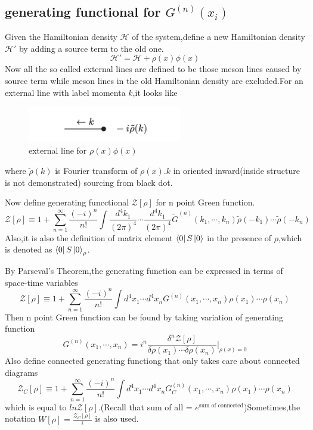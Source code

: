 \documentclass[a4paper]{article}
\begin{document}
\subsection{generating functional for $G^{(n)}(x_i)$}
Given the Hamiltonian density $\mathscr{H}$ of the system,define a new Hamiltonian density $\mathscr{H}'$ by adding a source term to the old one.$$\mathscr{H}'=\mathscr{H}+\rho(x)\phi(x)$$Now all the so called external lines are defined to be those meson lines caused by source term while meson lines in the old Hamiltonian density are excluded.For an external line with label momenta $k$,it looks like
\begin{figure}[htbp]
	\centering
	\includegraphics[width=0.6\textwidth]{21.png}
	\caption{external line for $\rho(x)\phi(x)$}
\end{figure}

where $\tilde{\rho}(k)$ is Fourier transform of $\rho(x)$.$k$ in oriented inward(inside structure is not demonstrated) sourcing from black dot.
\par Now define generating funcctional $\mathscr{Z}[\rho]$ for n point Green function.
$$\mathscr{Z}[\rho]\equiv1+\sum_{n=1}^{\infty}\frac{(-i)^n}{n!}\int\frac{d^4k_1}{(2\pi)^4}\cdots\frac{d^4k_1}{(2\pi)^4}\tilde{G}^{(n)}(k_1,\cdots,k_n)\tilde{\rho}(-k_1)\cdots\tilde{\rho}(-k_n)$$
Also,it is also the definition of matrix element $\bra{0}S\ket{0}$ in the presence of $\rho$,which is denoted as $\bra{0}S\ket{0}_{\rho}$.
\par By Parseval's Theorem,the generating function can be expressed in terms of space-time variables$$\mathscr{Z}[\rho]\equiv1+\sum_{n=1}^{\infty}\frac{(-i)^n}{n!}\int d^4x_1\cdots d^4x_nG^{(n)}(x_1,\cdots,x_n)\rho(x_1)\cdots\rho(x_n)$$
Then n point Green function can be found by taking variation of generating function
$$G^{(n)}(x_1,\cdots,x_n)=i^n\frac{\delta^n\mathscr{Z}[\rho]}{\delta\rho(x_1)\cdots\delta\rho(x_n)}\Big|_{\rho(x)=0}$$
Also define connected generating functiong that only takes care about connected diagrams
$$\mathscr{Z}_C[\rho]\equiv1+\sum_{n=1}^{\infty}\frac{(-i)^n}{n!}\int d^4x_1\cdots d^4x_nG^{(n)}_C(x_1,\cdots,x_n)\rho(x_1)\cdots\rho(x_n)$$
which is equal to $ln\mathscr{Z}[\rho]$.(Recall that sum of all = $e^{\text{sum of connected}}$)Sometimes,the notation $W[\rho]=\frac{\mathscr{Z}_C[\rho]}{i}$ is also used.
\end{document}
